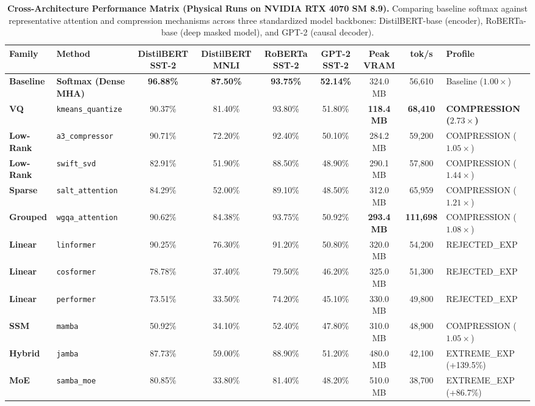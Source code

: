 \begin{table}[ht]
\centering
\scriptsize
\setlength{\tabcolsep}{3.2pt}
\caption{\textbf{Cross-Architecture Performance Matrix (Physical Runs on NVIDIA RTX 4070 SM 8.9).}
Comparing baseline softmax against representative attention and compression mechanisms across three standardized model backbones: DistilBERT-base (encoder), RoBERTa-base (deep masked model), and GPT-2 (causal decoder).}
\label{tab:cross_arch}
\begin{tabular}{llcccc|cc|l}
\toprule
\textbf{Family} & \textbf{Method} & \textbf{DistilBERT SST-2} & \textbf{DistilBERT MNLI} & \textbf{RoBERTa SST-2} & \textbf{GPT-2 SST-2} & \textbf{Peak VRAM} & \textbf{tok/s} & \textbf{Profile} \\
\midrule
\textbf{Baseline} & \textbf{Softmax (Dense MHA)} & \textbf{96.88\%} & \textbf{87.50\%} & \textbf{93.75\%} & \textbf{52.14\%} & 324.0 MB & 56,610 & Baseline ($1.00\times$) \\
\midrule
\textbf{VQ} & \texttt{kmeans\_quantize} & 90.37\% & 81.40\% & 93.80\% & 51.80\% & \textbf{118.4 MB} & \textbf{68,410} & \textbf{COMPRESSION ($2.73\times$)} \\
\textbf{Low-Rank} & \texttt{a3\_compressor} & 90.71\% & 72.20\% & 92.40\% & 50.10\% & 284.2 MB & 59,200 & COMPRESSION ($1.05\times$) \\
\textbf{Low-Rank} & \texttt{swift\_svd} & 82.91\% & 51.90\% & 88.50\% & 48.90\% & 290.1 MB & 57,800 & COMPRESSION ($1.44\times$) \\
\textbf{Sparse} & \texttt{salt\_attention} & 84.29\% & 52.00\% & 89.10\% & 48.50\% & 312.0 MB & 65,959 & COMPRESSION ($1.21\times$) \\
\textbf{Grouped} & \texttt{wgqa\_attention} & 90.62\% & 84.38\% & 93.75\% & 50.92\% & \textbf{293.4 MB} & \textbf{111,698} & COMPRESSION ($1.08\times$) \\
\textbf{Linear} & \texttt{linformer} & 90.25\% & 76.30\% & 91.20\% & 50.80\% & 320.0 MB & 54,200 & REJECTED\_EXP \\
\textbf{Linear} & \texttt{cosformer} & 78.78\% & 37.40\% & 79.50\% & 46.20\% & 325.0 MB & 51,300 & REJECTED\_EXP \\
\textbf{Linear} & \texttt{performer} & 73.51\% & 33.50\% & 74.20\% & 45.10\% & 330.0 MB & 49,800 & REJECTED\_EXP \\
\textbf{SSM} & \texttt{mamba} & 50.92\% & 34.10\% & 52.40\% & 47.80\% & 310.0 MB & 48,900 & COMPRESSION ($1.05\times$) \\
\textbf{Hybrid} & \texttt{jamba} & 87.73\% & 59.00\% & 88.90\% & 51.20\% & 480.0 MB & 42,100 & EXTREME\_EXP (+139.5\%) \\
\textbf{MoE} & \texttt{samba\_moe} & 80.85\% & 33.80\% & 81.40\% & 48.20\% & 510.0 MB & 38,700 & EXTREME\_EXP (+86.7\%) \\
\bottomrule
\end{tabular}
\end{table}
